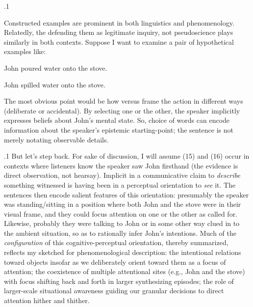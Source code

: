 \documentclass[11pt, twocolumn]{article}
\begin{document}
\p.1{%
Constructed examples are prominent in both linguistics
and phenomenology.  Relatedly, the 
\mdash{} defending them as legitimate inquiry, not pseudoscience
\mdash{} plays similarly in both contexts.  Suppose I want to examine a
pair of hypothetical examples like:

\begin{exsGroup}

\exsItem{}   John poured water onto the stove.

\exsItem{}   John spilled water onto the stove.

\end{exsGroup}

\nip
The most obvious point would be how  versus  frame the
action in different ways (deliberate or accidental).  By selecting
one or the other, the speaker implicitly expresses beliefs about
John's mental state.  So, choice of words can encode
information about the speaker's epistemic starting-point; the
sentence is not merely notating observable details.
} %

\p.1{%
But let's step back.  For sake of discussion, I will assume \exsRef(15) and \exsRef(16)
occur in contexts where listeners know the speaker saw John firsthand
(the evidence is direct observation, not hearsay).  Implicit
in a communicative claim to \textit{describe} something witnessed
is having been in a perceptual orientation to \textit{see} it.  The
sentences then encode salient features of this orientation:
presumably the speaker was standing/sitting in a position
where both John and the stove were in their visual frame,
and they could focus attention on one or the other as
called for.  Likewise, probably they were talking to
John or in some other way clued in to the ambient situation, so
as to rationally infer John's intentions.  Much of the
\textit{configuration} of this cognitive-perceptual orientation,
thereby summarized, reflects my sketched 
for phenomenological description: the intentional relations toward
objects insofar as we deliberately orient toward them
as a focus of attention; the coexistence of multiple
attentional sites (e.g., John and the stove) with focus
shifting back and forth in larger synthesizing episodes;
the role of larger-scale situational awareness guiding
our granular decisions to direct attention hither and thither.
} %
\end{document}
